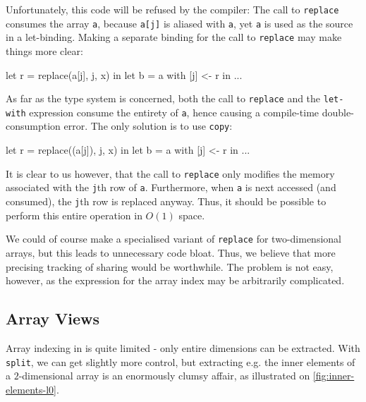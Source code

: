 Unfortunately, this code will be refused by the compiler: The call to
\texttt{replace} consumes the array \texttt{a}, because \texttt{a[j]}
is aliased with \texttt{a}, yet \texttt{a} is used as the source in a
let-binding.  Making a separate binding for the call to
\texttt{replace} may make things more clear:

\begin{colorcode}
let r = replace(a[j], j, x) in 
let b = a with [j] <- r in
...
\end{colorcode}

As far as the type system is concerned, both the call to
\texttt{replace} and the \texttt{let-with} expression consume the
entirety of \texttt{a}, hence causing a compile-time
double-consumption error.  The only solution is to use \texttt{copy}:

\begin{colorcode}
let r = replace((a[j]), j, x) in 
let b = a with [j] <- r in
...
\end{colorcode}

It is clear to us however, that the call to \texttt{replace} only
modifies the memory associated with the \texttt{j}th row of
\texttt{a}.  Furthermore, when \texttt{a} is next accessed (and
consumed), the \texttt{j}th row is replaced anyway.  Thus, it should
be possible to perform this entire operation in $O(1)$ space.

We could of course make a specialised variant of \texttt{replace} for
two-dimensional arrays, but this leads to unnecessary code bloat.
Thus, we believe that more precising tracking of sharing would be
worthwhile.  The problem is not easy, however, as the expression for
the array index may be arbitrarily complicated.

\subsection{Array Views}

Array indexing in \LO{} is quite limited - only entire dimensions can
be extracted.  With \texttt{split}, we can get slightly more control,
but extracting e.g. the inner elements of a $2$-dimensional array is
an enormously clumsy affair, as illustrated on
\cref{fig:inner-elements-l0}.

